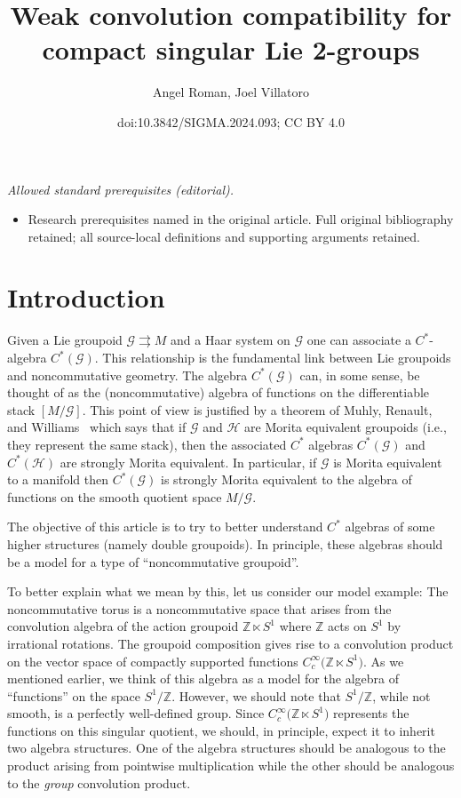 \documentclass[10pt,a4paper]{amsart}
\title{Weak convolution compatibility for compact singular Lie 2-groups}
\author{Angel Roman, Joel Villatoro}
\date{doi:10.3842/SIGMA.2024.093; CC BY 4.0}
\numberwithin{equation}{section}
\theoremstyle{definition}
\newcommand{\BBZ}{\mathbb{Z}}
\newcommand{\CG}{\mathcal{G}}
\newcommand{\CH}{\mathcal{H}}
\newcommand{\grpd}{\rightrightarrows}
\begin{document}
\maketitle
\noindent\textit{Allowed standard prerequisites (editorial).}\begin{itemize}
\item Research prerequisites named in the original article. Full original bibliography retained; all source-local definitions and supporting arguments retained.
\end{itemize}\medskip
\section{Introduction}
Given a Lie groupoid $ \CG \grpd M $ and a Haar system on $ \CG $ one can associate a $ C^*$-algebra $ C^* (\CG) $. This relationship is the fundamental link between Lie groupoids and noncommutative geometry.
The algebra $ C^*(\CG) $ can, in some sense, be thought of as the (noncommutative) algebra of functions on the differentiable stack $ [M/\CG] $.
This point of view is justified by a theorem of Muhly, Renault, and Williams~\cite[Theorem 2.8]{MuhlyRenaultWilliams} which says that if $ \CG $ and $ \CH $ are Morita equivalent groupoids (i.e., they represent the same stack), then the associated $ C^* $ algebras $ C^* (\CG ) $ and $ C^*(\CH)$ are strongly Morita equivalent.
In particular, if $ \CG $ is Morita equivalent to a manifold then $ C^*(\CG) $ is strongly Morita equivalent to the algebra of functions on the smooth quotient space $ M / \CG $.

The objective of this article is to try to better understand $C^* $ algebras of some higher structures (namely double groupoids). In principle, these algebras should be a model for a type of ``noncommutative groupoid''.

To better explain what we mean by this, let us consider our model example: The noncommutative torus is a noncommutative space that arises from the convolution algebra of the action groupoid $ \BBZ \ltimes S^1 $ where $ \BBZ $ acts on $ S^1 $ by irrational rotations. The groupoid composition gives rise to a convolution product on the vector space of compactly supported functions $ C_c^\infty\big(\BBZ \ltimes S^1\big) $. As we mentioned earlier, we think of this algebra as a model for the algebra of ``functions'' on the space $ S^1/\BBZ $.
However, we should note that $ S^1/\BBZ$, while not smooth, is a perfectly well-defined group.
Since $ C_c^\infty\big(\BBZ \ltimes S^1\big) $ represents the functions on this singular quotient, we should, in principle, expect it to inherit two algebra structures. One of the algebra structures should be analogous to the product arising from pointwise multiplication while the other should be analogous to the \emph{group} convolution product.
\end{document}
